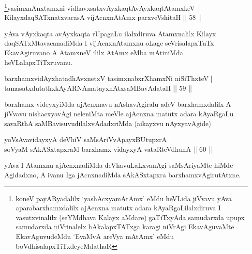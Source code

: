 
\begin{shl}
\footnote{koneV payARyadalilx `yashAcxyamAtAmx' eMdu heVLida jiVvavu yAva aparabarxhamxdalilx ajAcnxna matutx adara kAyaRgaLilalxdiruva I vasutxvinalilx (seYMdhava Kalayx aMdare) gaTiTxyAda samudarxda upupx samudarxda niVrinalelx hAkalapxTATxga karagi niVrAgi EkavAguvaMte EkavAguvudeMdu `EvaMvA areV\s ya mAtAmx' eMdu   boVdhisalapxTiTxdeyeMdathaR}yasimxnAnxtamxni vidhavxsatxvAyxkaqtAvAyxkaqtAtamxkeV |\\
KilayxdaqSATxnatxvacasA vijAcnxnAtAmx parxveVshitaH \hfill || 58 ||
\end{shl}

\begin{artha}
 yAva vAyxkaqta avAyxkaqta rUpagaLu ilalxdiruva Atamxnalilx Kilayx daqSATxMtavacanadiMda I vijAcnxnAtamxnu oLage seVrisalapxTuTx EkavAgiruvano A AtamxneV ililx AtAmx eMba mAtiniMda heVLalapxTiTxruvanu.
\end{artha}


\begin{shl}
barxhamxvidAyxhatadhAvxnetxV tasimxnabxrXhamxNi niSiThxteV |\\
tamasatxdutathxkAyARNAmatayxnAtxsaMBavAdataH \hfill || 59 ||
\end{shl}

\begin{artha}
barxhamx videyxyiMda ajAcnxnavu nAshavAgiralu adeV barxhamxdalilx A
jiVvavu nishacxyavAgi neleniMta meVle ajAcnxna matutx adara kAyaRgaLu
savaRthA saMBavisuvudilalxvAdadxriMda (aikayxvu nAyxyavAgide)
\end{artha}


\begin{shl}
yoV\s sAvavidayxyA deVhiV saMsAriVvApayxBUtupxrA |\\
soV\s yaM sAkASxtapxraM barxhamx vidayxyA vataRteV\s dhunA \hfill || 60 ||
\end{shl} 

\begin{artha}
yAva I Atamxnu ajAcnxnadiMda deVhavuLaLxvanAgi saMsAriyaMte hiMde Agidadxno, A ivanu Iga jAcnxnadiMda sAkASxtapxra barxhamxvAgirutAtxne.
\end{artha}


